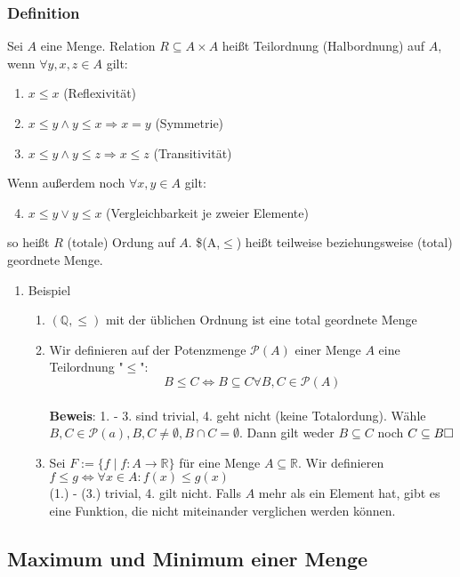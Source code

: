 \documentclass[11pt]{article}
\DeclareMathOperator{\Forall}{\forall}%
\begin{document}
\subsubsection{Definition}
\label{sec-2-6-1}
Sei $A$ eine Menge. Relation $R\subseteq A\times A$ heißt Teilordnung (Halbordnung) auf $A$, wenn $\Forall y,x,z\in A$ gilt:
\begin{enumerate}
\item $x\leq x$ \hfill (Reflexivität)
\item $x\leq y \wedge y\leq x \Rightarrow x = y$ \hfill (Symmetrie)
\item $x\leq y \wedge y\leq z \Rightarrow x\leq z$ \hfill (Transitivität)
\end{enumerate}
Wenn außerdem noch $\Forall x,y\in A$ gilt:
\begin{enumerate}
\setcounter{enumi}{3}
\item $x\leq y \vee y\leq x$ \hfill (Vergleichbarkeit je zweier Elemente)
\end{enumerate}
so heißt $R$ (totale) Ordung auf $A$. \$(A,$\le$) heißt teilweise beziehungsweise (total) geordnete Menge.
\begin{enumerate}
\item Beispiel
\label{sec-2-6-1-1}
\begin{enumerate}
\item $(\mathbb{Q},\leq)$ mit der üblichen Ordnung ist eine total geordnete Menge
\item Wir definieren auf der Potenzmenge $\mathcal{P}(A)$ einer Menge $A$ eine Teilordnung "$\leq$": \[B\leq C \Leftrightarrow B \subseteq C\Forall B,C\in \mathcal{P}(A)\] \\
        \textbf{Beweis}: 1. - 3. sind trivial, 4. geht nicht (keine Totalordung). Wähle $B,C\in \mathcal{P}(a), B,C\neq \emptyset, B\cap C = \emptyset$. Dann gilt weder $B\subseteq C$ noch $C\subseteq B\hfill\square$
\item Sei $F:=\{f\mid f:A\to\mathbb{R}\}$ für eine Menge $A\subseteq \mathbb{R}$. Wir definieren $f\leq g \Leftrightarrow \Forall x\in A: f(x) \leq g(x)$ \\
        (1.) - (3.) trivial, 4. gilt nicht. Falls $A$ mehr als ein Element hat, gibt es eine Funktion, die nicht miteinander verglichen werden können.
\end{enumerate}
\end{enumerate}
\subsection{Maximum und Minimum einer Menge}
\label{sec-2-7}
\end{document}

